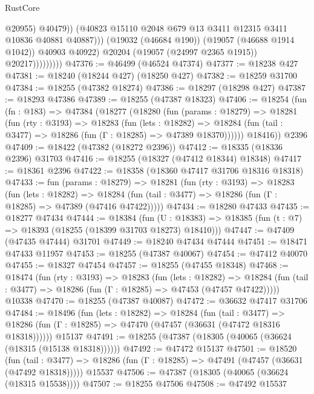 \begin{lexlean}{RustCore}
\begin{coremodule}
                                  @20955)
                                @40479))
                            (@40823 @15110 @2048 @679 @13 @3411 @12315 @3411 @10836 @40881 @40887)))
                        (@19032 (@46684 @190))
                        (@19057 (@46688 @1914 @1042))
                        @40903
                        @40922)
                      @20204
                      (@19057 (@24997 @2365 @1915))
                      @20217)))))))))
@47376 := @46499 (@46524 @47374)
@47377 := @18238 @427
@47381 := @18240 (@18244 @427) (@18250 @427)
@47382 := @18259 @31700
@47384 := @18255 (@47382 @18274)
@47386 := @18297 (@18298 @427)
@47387 := @18293 @47386
@47389 := @18255 (@47387 @18323)
@47406 := @18254
    (fun (fn : @183) =>
    @47384
      (@18277
        (@18280
          (fun (params : @18279) =>
          @18281
            (fun (rty : @3193) =>
            @18283
              (fun (lets : @18282) =>
              @18284 (fun (tail : @3477) => @18286 (fun (Γ : @18285) => @47389 @18370))))))
        @18416))
    @2396
@47409 := @18422 (@47382 (@18272 @2396))
@47412 := @18335 (@18336 @2396) @31703
@47416 := @18255 (@18327 (@47412 @18344) @18348)
@47417 := @18361 @2396
@47422 := @18358 (@18360 @47417 @31706 @18316 @18318)
@47433 := fun (params : @18279) =>
  @18281
    (fun (rty : @3193) =>
    @18283
      (fun (lets : @18282) =>
      @18284 (fun (tail : @3477) => @18286 (fun (Γ : @18285) => @47389 (@47416 @47422)))))
@47434 := @18280 @47433
@47435 := @18277 @47434
@47444 := @18384
    (fun (U : @18383) => @18385 (fun (t : @7) => @18393 (@18255 (@18399 @31703 @18273) @18410)))
@47447 := @47409 (@47435 @47444) @31701
@47449 := @18240 @47434 @47444
@47451 := @18471 @47433 @11957
@47453 := @18255 (@47387 @40067)
@47454 := @47412 @40070
@47455 := @18327 @47454
@47457 := @18255 (@47455 @18348)
@47468 := @18474
    (fun (rty : @3193) =>
    @18283
      (fun (lets : @18282) =>
      @18284 (fun (tail : @3477) => @18286 (fun (Γ : @18285) => @47453 (@47457 @47422)))))
    @10338
@47470 := @18255 (@47387 @40087)
@47472 := @36632 @47417 @31706
@47484 := @18496
    (fun (lets : @18282) =>
    @18284
      (fun (tail : @3477) =>
      @18286 (fun (Γ : @18285) => @47470 (@47457 (@36631 (@47472 @18316 @18318))))))
    @15137
@47491 := @18255 (@47387 (@18305 (@40065 (@36624 (@18315 (@15138 @18318))))))
@47492 := @47472 @15137
@47501 := @18520
    (fun (tail : @3477) => @18286 (fun (Γ : @18285) => @47491 (@47457 (@36631 (@47492 @18318)))))
    @15537
@47506 := @47387 (@18305 (@40065 (@36624 (@18315 @15538))))
@47507 := @18255 @47506
@47508 := @47492 @15537

\end{coremodule}
\end{lexlean}
